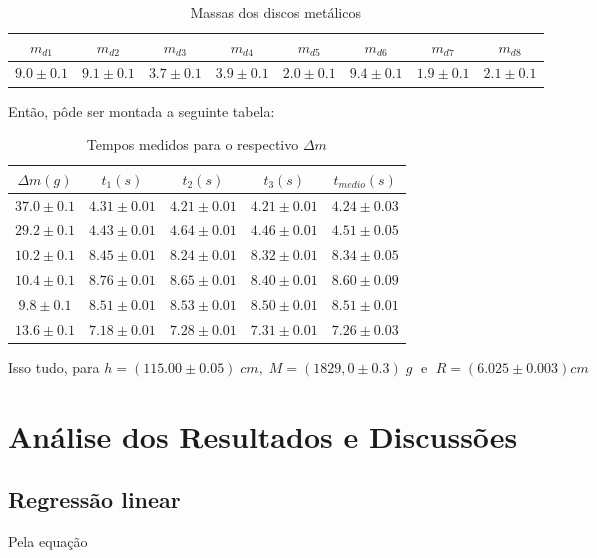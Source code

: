 \documentclass[12pt,a4paper]{article}
\begin{document}
\begin{table}[!htbp]
\centering
\caption{Massas dos discos metálicos}
\begin{tabular}{|c|c|c|c|c|c|c|c|}
\hline 
$m_{d1}$ & $m_{d2}$ & $m_{d3}$ & $m_{d4}$ & $m_{d5}$ & $m_{d6}$ & $m_{d7}$ & $m_{d8}$\\ 
\hline 
$9.0 \pm 0.1$ & $9.1 \pm 0.1$ & $3.7 \pm 0.1$ & $3.9 \pm 0.1$ & $2.0 \pm 0.1$ & $9.4 \pm 0.1$ & $1.9 \pm 0.1$ & $2.1 \pm 0.1$\\ 
\hline
\end{tabular} 
\label{MassaDiscos}
\end{table}

Então, pôde ser montada a seguinte tabela:

\newpage

\begin{table}[!htbp]
\centering
\caption{Tempos medidos para o respectivo $\Delta m$}
\begin{tabular}{|c|c|c|c|c|}

\hline 
$\Delta m (g)$ & $t_1 (s)$ & $t_2 (s)$ & $t_3 (s)$ & $t_{medio} (s)$ \\ 
\hline 
$37.0 \pm 0.1$ & $4.31 \pm 0.01$ & $4.21 \pm 0.01$ & $4.21 \pm 0.01$ & $4.24 \pm 0.03$ \\ 
\hline 
$29.2 \pm 0.1$ & $4.43 \pm 0.01$ & $4.64 \pm 0.01$ & $4.46 \pm 0.01$ & $4.51 \pm 0.05$ \\ 
\hline 
$10.2 \pm 0.1$ & $8.45 \pm 0.01$ & $8.24 \pm 0.01$ & $8.32 \pm 0.01$ & $8.34 \pm 0.05$ \\ 
\hline 
$10.4 \pm 0.1$ & $8.76 \pm 0.01$ & $8.65 \pm 0.01$ & $8.40 \pm 0.01$ & $8.60 \pm 0.09$ \\ 
\hline 
$9.8 \pm 0.1$ & $8.51 \pm 0.01$ & $8.53 \pm 0.01$ & $8.50 \pm 0.01$ & $8.51 \pm 0.01$ \\ 
\hline 
$13.6 \pm 0.1$ & $7.18 \pm 0.01$ & $7.28 \pm 0.01$ & $7.31 \pm 0.01$ & $7.26 \pm 0.03$ \\ 
\hline 

\end{tabular} 
\label{Tempos}
\end{table}

Isso tudo, para $h = (115.00 \pm 0.05) \; cm, \; M = (1829,0 \pm 0.3) \; g \;$ e $\; R = (6.025 \pm 0.003) cm$

\section{Análise dos Resultados e Discussões}
\subsection{Regressão linear}
Pela equação 
\end{document}
